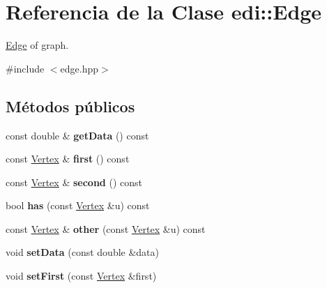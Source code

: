 \hypertarget{classedi_1_1Edge}{}\section{Referencia de la Clase edi\+:\+:Edge}
\label{classedi_1_1Edge}


\hyperlink{classedi_1_1Edge}{Edge} of graph.  




{\ttfamily \#include $<$edge.\+hpp$>$}

\subsection*{Métodos públicos}
\begin{DoxyCompactItemize}
\item 
\hypertarget{classedi_1_1Edge_a8eb51032db5e32ea749cb35c200421b3}{}const double \& {\bfseries get\+Data} () const \label{classedi_1_1Edge_a8eb51032db5e32ea749cb35c200421b3}

\item 
\hypertarget{classedi_1_1Edge_aa5397d73c8f574107d0d5f894ea76957}{}const \hyperlink{classedi_1_1Vertex}{Vertex} \& {\bfseries first} () const \label{classedi_1_1Edge_aa5397d73c8f574107d0d5f894ea76957}

\item 
\hypertarget{classedi_1_1Edge_aa545cce56b29c213e3eb4d2021c2c1c2}{}const \hyperlink{classedi_1_1Vertex}{Vertex} \& {\bfseries second} () const \label{classedi_1_1Edge_aa545cce56b29c213e3eb4d2021c2c1c2}

\item 
\hypertarget{classedi_1_1Edge_aa4e3c3020eac39e526e440e515259126}{}bool {\bfseries has} (const \hyperlink{classedi_1_1Vertex}{Vertex} \&u) const \label{classedi_1_1Edge_aa4e3c3020eac39e526e440e515259126}

\item 
\hypertarget{classedi_1_1Edge_a7fd7131daa7fff92342bc4ca8442235e}{}const \hyperlink{classedi_1_1Vertex}{Vertex} \& {\bfseries other} (const \hyperlink{classedi_1_1Vertex}{Vertex} \&u) const \label{classedi_1_1Edge_a7fd7131daa7fff92342bc4ca8442235e}

\item 
\hypertarget{classedi_1_1Edge_a0a3d03f9b68bb170c83851885542fe81}{}void {\bfseries set\+Data} (const double \&data)\label{classedi_1_1Edge_a0a3d03f9b68bb170c83851885542fe81}

\item 
\hypertarget{classedi_1_1Edge_add3c3d74af84f7c841e35fc4cdc18b92}{}void {\bfseries set\+First} (const \hyperlink{classedi_1_1Vertex}{Vertex} \&first)\label{classedi_1_1Edge_add3c3d74af84f7c841e35fc4cdc18b92}


\end{DoxyCompactItemize}
